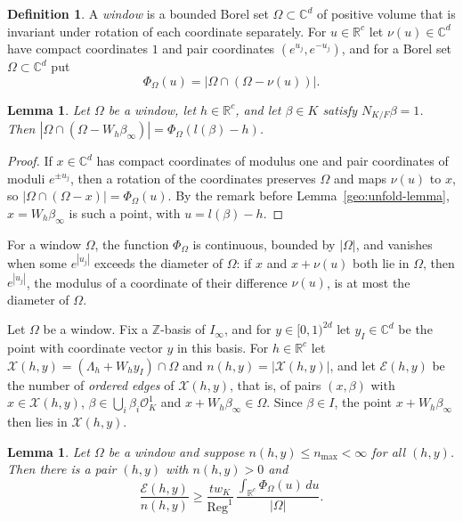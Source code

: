 \documentclass[11pt]{amsart}
\numberwithin{equation}{section}
\newtheorem{lemma}[equation]{Lemma}
\theoremstyle{definition}
\newtheorem{definition}[equation]{Definition}
\theoremstyle{remark}
\newcommand{\R}{\mathbb R}
\newcommand{\C}{\mathbb C}
\newcommand{\Z}{\mathbb Z}
\begin{document}
\begin{definition}\label{geo:window}
A \emph{window} is a bounded Borel set $\Omega\subset\C^d$ of positive
volume that is invariant under rotation of each coordinate separately.
For $u\in\R^c$ let $\nu(u)\in\C^d$ have compact coordinates $1$ and
pair coordinates $(e^{u_j},e^{-u_j})$, and for a Borel set
$\Omega\subset\C^d$ put
\[
 \Phi_\Omega(u)=|\Omega\cap(\Omega-\nu(u))|.
\]
\end{definition}

\begin{lemma}\label{geo:phi-omega}
Let $\Omega$ be a window, let $h\in\R^c$, and let $\beta\in K$ satisfy
$N_{K/F}\beta=1$. Then
$|\Omega\cap(\Omega-W_h\beta_\infty)|=\Phi_\Omega(l(\beta)-h)$.
\end{lemma}

\begin{proof}
If $x\in\C^d$ has compact coordinates of modulus one and pair
coordinates of moduli $e^{\pm u_j}$, then a rotation of the coordinates
preserves $\Omega$ and maps $\nu(u)$ to $x$, so
$|\Omega\cap(\Omega-x)|=\Phi_\Omega(u)$. By the remark before
Lemma~\ref{geo:unfold-lemma}, $x=W_h\beta_\infty$ is such a point, with
$u=l(\beta)-h$.
\end{proof}

For a window $\Omega$, the function $\Phi_\Omega$ is continuous, bounded
by $|\Omega|$, and vanishes when some $e^{|u_j|}$ exceeds the diameter of
$\Omega$: if $x$ and $x+\nu(u)$ both lie in $\Omega$, then $e^{|u_j|}$,
the modulus of a coordinate of their difference $\nu(u)$, is at most the
diameter of $\Omega$.

Let $\Omega$ be a window. Fix a $\Z$-basis of $I_\infty$, and for
$y\in[0,1)^{2d}$ let $y_I\in\C^d$ be the point with coordinate vector $y$
in this basis. For $h\in\R^c$ let
$\mathcal X(h,y)=(\Lambda_h+W_hy_I)\cap\Omega$ and
$n(h,y)=|\mathcal X(h,y)|$, and let $\mathcal E(h,y)$ be the number of
\emph{ordered edges} of $\mathcal X(h,y)$, that is, of pairs $(x,\beta)$
with $x\in\mathcal X(h,y)$, $\beta\in\bigcup_i\beta_i\mathcal O_K^1$ and
$x+W_h\beta_\infty\in\Omega$. Since $\beta\in I$, the point
$x+W_h\beta_\infty$ then lies in $\mathcal X(h,y)$.

\begin{lemma}\label{geo:joint-average-lemma}
Let $\Omega$ be a window and suppose $n(h,y)\le n_{\max}<\infty$ for
all $(h,y)$. Then there is a pair $(h,y)$ with $n(h,y)>0$ and
\begin{equation}\label{geo:joint-average}
 \frac{\mathcal E(h,y)}{n(h,y)}\ge
 \frac{tw_K}{\operatorname{Reg}^1}\,
 \frac{\int_{\R^c}\Phi_\Omega(u)\,du}{|\Omega|}.
\end{equation}
\end{lemma}
\end{document}
